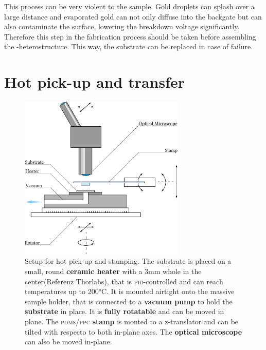 This process can be very violent to the sample. Gold droplets can splash over a large distance and evaporated gold can not only diffuse into the backgate but can also contaminate the \sio surface, lowering the breakdown voltage significantly. Therefore this step in the fabrication process should be taken before assembling the \tmd-\hbng heterostructure. This way, the substrate can be replaced in case of failure.

\section{Hot pick-up and transfer}\label{hot_pickup}

\begin{figure}
	\centering
	\includegraphics[width=0.7\textwidth]{Stempelaufbau.png}

	\caption{Setup for hot pick-up and stamping. The substrate is placed on a small, round \textbf{ceramic heater} with a 3mm whole in the center(Referenz Thorlabs), that is \textsc{pid}-controlled and can reach temperatures up to 200°C. It is mounted airtight onto the massive sample holder, that is connected to a \textbf{vacuum pump} to hold the \textbf{substrate} in place. It is \textbf{fully rotatable} and can be moved in plane. The \textsc{pdms/ppc} \textbf{stamp} is monted to a z-translator and can be tilted with respecto to both in-plane axes. The \textbf{optical microscope} can also be moved in-plane.}
	\label{stamping-setup}
\end{figure}


